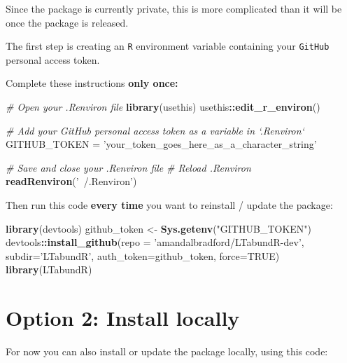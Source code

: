 \documentclass[
]{book}
\newenvironment{Shaded}{\begin{snugshade}}{\end{snugshade}}
\newcommand{\CommentTok}[1]{\textcolor[rgb]{0.56,0.35,0.01}{\textit{#1}}}
\newcommand{\DataTypeTok}[1]{\textcolor[rgb]{0.13,0.29,0.53}{#1}}
\newcommand{\KeywordTok}[1]{\textcolor[rgb]{0.13,0.29,0.53}{\textbf{#1}}}
\newcommand{\NormalTok}[1]{#1}
\newcommand{\OperatorTok}[1]{\textcolor[rgb]{0.81,0.36,0.00}{\textbf{#1}}}
\newcommand{\OtherTok}[1]{\textcolor[rgb]{0.56,0.35,0.01}{#1}}
\newcommand{\StringTok}[1]{\textcolor[rgb]{0.31,0.60,0.02}{#1}}
\begin{document}
Since the package is currently private, this is more complicated than it will be once the package is released.

The first step is creating an \texttt{R} environment variable containing your \texttt{GitHub} personal access token.

Complete these instructions \textbf{only once:}

\begin{Shaded}
\begin{Highlighting}[]
\CommentTok{# Open your .Renviron file}
\KeywordTok{library}\NormalTok{(usethis)}
\NormalTok{usethis}\OperatorTok{::}\KeywordTok{edit_r_environ}\NormalTok{()}

\CommentTok{# Add your GitHub personal access token as a variable in `.Renviron`}
\NormalTok{GITHUB_TOKEN =}\StringTok{ 'your_token_goes_here_as_a_character_string'}

\CommentTok{# Save and close your .Renviron file}
\CommentTok{# Reload .Renviron}
\KeywordTok{readRenviron}\NormalTok{(}\StringTok{'~/.Renviron'}\NormalTok{)}
\end{Highlighting}
\end{Shaded}

Then run this code \textbf{every time} you want to reinstall / update the package:

\begin{Shaded}
\begin{Highlighting}[]
\KeywordTok{library}\NormalTok{(devtools)}
\NormalTok{github_token <-}\StringTok{ }\KeywordTok{Sys.getenv}\NormalTok{(}\StringTok{"GITHUB_TOKEN"}\NormalTok{)}
\NormalTok{devtools}\OperatorTok{::}\KeywordTok{install_github}\NormalTok{(}\DataTypeTok{repo =} \StringTok{'amandalbradford/LTabundR-dev'}\NormalTok{,}
                         \DataTypeTok{subdir=}\StringTok{'LTabundR'}\NormalTok{,}
                         \DataTypeTok{auth_token=}\NormalTok{github_token,}
                         \DataTypeTok{force=}\OtherTok{TRUE}\NormalTok{)}
\KeywordTok{library}\NormalTok{(LTabundR)}
\end{Highlighting}
\end{Shaded}

\hypertarget{option-2-install-locally}{%
\section*{Option 2: Install locally}\label{option-2-install-locally}}

For now you can also install or update the package locally, using this code:
\end{document}
